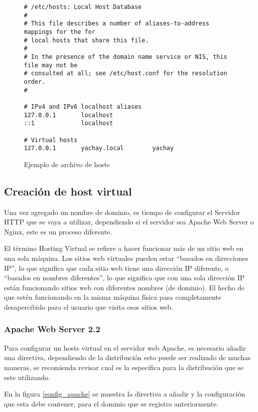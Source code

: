 \begin{figure}
\begin{verbatim}
# /etc/hosts: Local Host Database
#
# This file describes a number of aliases-to-address mappings for the for 
# local hosts that share this file.
#
# In the presence of the domain name service or NIS, this file may not be 
# consulted at all; see /etc/host.conf for the resolution order.
#

# IPv4 and IPv6 localhost aliases
127.0.0.1       localhost
::1             localhost

# Virtual hosts
127.0.0.1       yachay.local        yachay
\end{verbatim}
\caption{Ejemplo de archivo de hosts}
\label{config_hosts}
\end{figure}

\subsection{Creación de host virtual}
Una vez agregado un nombre de dominio, es tiempo de configurar el Servidor HTTP
que se vaya a utilizar, dependiendo si el servidor sea Apache Web Server o
Nginx, este es un proceso diferente.

El término Hosting Virtual se refiere a hacer funcionar más de un sitio web en
una sola máquina. Los sitios web virtuales pueden estar ``basados en direcciones
IP'', lo que significa que cada sitio web tiene una dirección IP diferente, o
``basados en nombres diferentes'', lo que significa que con una sola dirección
IP están funcionando sitios web con diferentes nombres (de dominio). El hecho de
que estén funcionando en la misma máquina física pasa completamente
desapercibido para el usuario que visita esos sitios web\cite{Apache}.

\subsubsection{Apache Web Server 2.2}
Para configurar un hosts virtual en el servidor web Apache, es necesario añadir
una directiva, dependiendo de la distribución esto puede ser realizado de muchas
maneras, se recomienda revisar cual es la especifica para la distribución que se
este utilizando.

En la figura \ref{config_apache} se muestra la directiva a añadir y la
configuración que esta debe contener, para el dominio que se registro
anteriormente.

